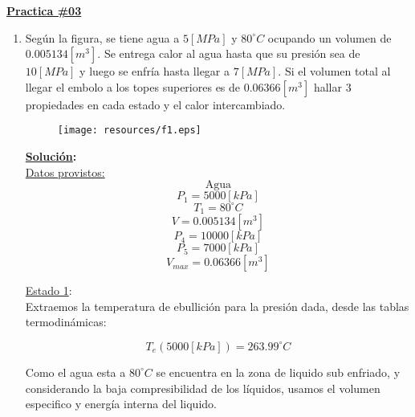 \documentclass[letter,11pt]{article}
\begin{document}
\begin{center}
    {\Large \bf{\underline{Practica \#03}}}
\end{center}

\begin{enumerate}
\item Según la figura, se tiene agua a $5[MPa]$ y $80^\circ C$ ocupando un
volumen de $0.005134[m^3]$. Se entrega calor al agua hasta que su presión sea de
$10[MPa]$ y luego se enfría hasta llegar a $7[MPa]$. Si el volumen total al
llegar el embolo a los topes superiores es de $0.06366[m^3]$ hallar $3$
propiedades en cada estado y el calor intercambiado.

\begin{figure}[!h]
\centering
\texttt{[image: resources/f1.eps]}
\end{figure}

\textbf{\underline{Solución}:} \\

\underline{Datos provistos:} \\

\begin{equation*}
    \text{Agua}
\end{equation*}
\begin{equation*}
    P_1=5000[kPa]
\end{equation*}
\begin{equation*}
    T_1=80^\circ C
\end{equation*}
\begin{equation*}
    V=0.005134[m^3]
\end{equation*}
\begin{equation*}
    P_4=10000[kPa]
\end{equation*}
\begin{equation*}
    P_5=7000[kPa]
\end{equation*}
\begin{equation*}
    V_{max}=0.06366[m^3]
\end{equation*}

\underline{Estado 1}:\\
Extraemos la temperatura de ebullición para la presión dada, desde las tablas
termodinámicas:

\begin{equation*}
    T_{e}(5000[kPa])=263.99^\circ C
\end{equation*}

Como el agua esta a $80^\circ C$ se encuentra en la zona de liquido sub enfriado,
y considerando la baja compresibilidad de los líquidos, usamos el volumen
especifico y energía interna del liquido. 


\end{enumerate}
\end{document}
